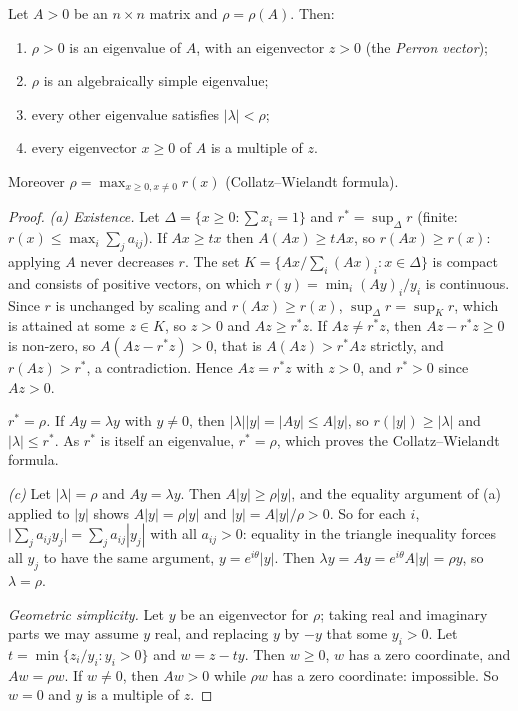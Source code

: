 \begin{theorem}[Perron, 1907]\label{linear:thm:perron}
Let $A>0$ be an $n\times n$ matrix and $\rho=\rho(A)$. Then:
\begin{enumerate}[label=(\alph*)]
\item $\rho>0$ is an eigenvalue of $A$, with an eigenvector $z>0$ (the \emph{Perron vector});
\item $\rho$ is an algebraically simple eigenvalue;
\item every other eigenvalue satisfies $|\lambda|<\rho$;
\item every eigenvector $x\ge0$ of $A$ is a multiple of $z$.
\end{enumerate}
Moreover $\rho=\max_{x\ge0,x\ne0}r(x)$ (Collatz--Wielandt formula).
\end{theorem}
\begin{proof}
\emph{(a) Existence.} Let $\Delta=\{x\ge0:\sum x_i=1\}$ and $r^*=\sup_\Delta r$ (finite: $r(x)\le\max_i\sum_ja_{ij}$). If
$Ax\ge tx$ then $A(Ax)\ge tAx$, so $r(Ax)\ge r(x)$: applying $A$ never decreases $r$. The set $K=\{Ax/\sum_i(Ax)_i:x\in\Delta\}$
is compact and consists of positive vectors, on which $r(y)=\min_i(Ay)_i/y_i$ is continuous. Since $r$ is unchanged by
scaling and $r(Ax)\ge r(x)$, $\sup_\Delta r=\sup_Kr$, which is attained at some $z\in K$, so $z>0$ and $Az\ge r^*z$. If
$Az\ne r^*z$, then $Az-r^*z\ge0$ is non-zero, so $A(Az-r^*z)>0$, that is $A(Az)>r^*Az$ strictly, and $r(Az)>r^*$, a
contradiction. Hence $Az=r^*z$ with $z>0$, and $r^*>0$ since $Az>0$.

\emph{$r^*=\rho$.} If $Ay=\lambda y$ with $y\ne0$, then $|\lambda||y|=|Ay|\le A|y|$, so $r(|y|)\ge|\lambda|$ and $|\lambda|\le
r^*$. As $r^*$ is itself an eigenvalue, $r^*=\rho$, which proves the Collatz--Wielandt formula.

\emph{(c)} Let $|\lambda|=\rho$ and $Ay=\lambda y$. Then $A|y|\ge\rho|y|$, and the equality argument of (a) applied to
$|y|$ shows $A|y|=\rho|y|$ and $|y|=A|y|/\rho>0$. So for each $i$, $\bigl|\sum_ja_{ij}y_j\bigr|=\sum_ja_{ij}|y_j|$ with all
$a_{ij}>0$: equality in the triangle inequality forces all $y_j$ to have the same argument, $y=e^{i\theta}|y|$. Then $\lambda
y=Ay=e^{i\theta}A|y|=\rho y$, so $\lambda=\rho$.

\emph{Geometric simplicity.} Let $y$ be an eigenvector for $\rho$; taking real and imaginary parts we may assume $y$ real,
and replacing $y$ by $-y$ that some $y_i>0$. Let $t=\min\{z_i/y_i:y_i>0\}$ and $w=z-ty$. Then $w\ge0$, $w$ has a zero
coordinate, and $Aw=\rho w$. If $w\ne0$, then $Aw>0$ while $\rho w$ has a zero coordinate: impossible. So $w=0$ and $y$ is
a multiple of $z$.


\end{proof}
